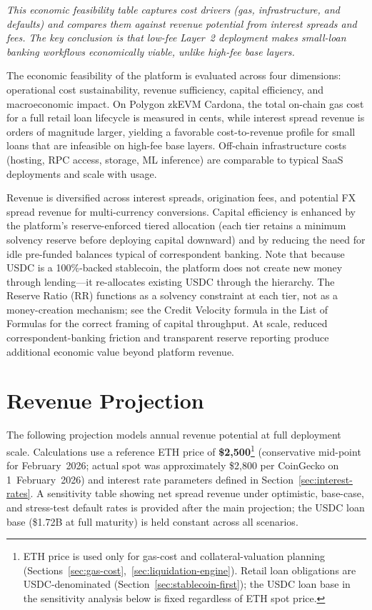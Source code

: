 \documentclass[12pt,a4paper]{report}
\begin{document}
\vspace{2pt}
\noindent\textit{\small This economic feasibility table captures cost drivers (gas, infrastructure, and defaults) and compares them against revenue potential from interest spreads and fees. The key conclusion is that low-fee Layer~2 deployment makes small-loan banking workflows economically viable, unlike high-fee base layers.}

The economic feasibility of the platform is evaluated across four dimensions: operational cost sustainability, revenue sufficiency, capital efficiency, and macroeconomic impact. On Polygon zkEVM Cardona, the total on-chain gas cost for a full retail loan lifecycle is measured in cents, while interest spread revenue is orders of magnitude larger, yielding a favorable cost-to-revenue profile for small loans that are infeasible on high-fee base layers. Off-chain infrastructure costs (hosting, RPC access, storage, ML inference) are comparable to typical SaaS deployments and scale with usage.

Revenue is diversified across interest spreads, origination fees, and potential FX spread revenue for multi-currency conversions. Capital efficiency is enhanced by the platform's reserve-enforced tiered allocation (each tier retains a minimum solvency reserve before deploying capital downward) and by reducing the need for idle pre-funded balances typical of correspondent banking. Note that because USDC is a 100\%-backed stablecoin, the platform does not create new money through lending---it re-allocates existing USDC through the hierarchy. The Reserve Ratio (RR) functions as a solvency constraint at each tier, not as a money-creation mechanism; see the Credit Velocity formula in the List of Formulas for the correct framing of capital throughput. At scale, reduced correspondent-banking friction and transparent reserve reporting produce additional economic value beyond platform revenue.

\section{Revenue Projection}

The following projection models annual revenue potential at full deployment scale. Calculations use a reference ETH price of \textbf{\$2,500}\footnote{ETH price is used only for gas-cost and collateral-valuation planning (Sections~\ref{sec:gas-cost},~\ref{sec:liquidation-engine}). Retail loan obligations are USDC-denominated (Section~\ref{sec:stablecoin-first}); the USDC loan base in the sensitivity analysis below is fixed regardless of ETH spot price.} (conservative mid-point for February~2026; actual spot was approximately \$2,800 per CoinGecko on 1~February~2026) and interest rate parameters defined in Section~\ref{sec:interest-rates}. A sensitivity table showing net spread revenue under optimistic, base-case, and stress-test default rates is provided after the main projection; the USDC loan base (\$1.72B at full maturity) is held constant across all scenarios.
\end{document}
